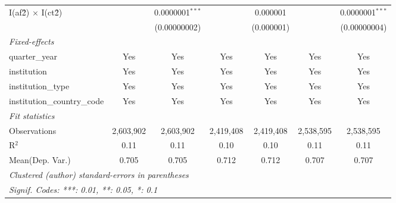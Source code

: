 \begin{tabular}{lcccccc}
   I(af\^2) $\times$ I(ct\^2)         &               & 0.0000001$^{***}$ &               & 0.000001        &               & 0.0000001$^{***}$\\   
                                      &               & (0.00000002)      &               & (0.000001)      &               & (0.00000004)\\   
   \midrule
   \emph{Fixed-effects}\\
   quarter\_year                      & Yes           & Yes               & Yes           & Yes             & Yes           & Yes\\  
   institution                        & Yes           & Yes               & Yes           & Yes             & Yes           & Yes\\  
   institution\_type                  & Yes           & Yes               & Yes           & Yes             & Yes           & Yes\\  
   institution\_country\_code         & Yes           & Yes               & Yes           & Yes             & Yes           & Yes\\  
   \midrule
   \emph{Fit statistics}\\
   Observations                       & 2,603,902     & 2,603,902         & 2,419,408     & 2,419,408       & 2,538,595     & 2,538,595\\  
   R$^2$                              & 0.11          & 0.11              & 0.10          & 0.10            & 0.11          & 0.11\\  
Mean(Dep. Var.) & 0.705 & 0.705 & 0.712 & 0.712 & 0.707 & 0.707 \\
   \midrule \midrule
   \multicolumn{7}{l}{\emph{Clustered (author) standard-errors in parentheses}}\\
   \multicolumn{7}{l}{\emph{Signif. Codes: ***: 0.01, **: 0.05, *: 0.1}}\\
\end{tabular}
\par\endgroup
